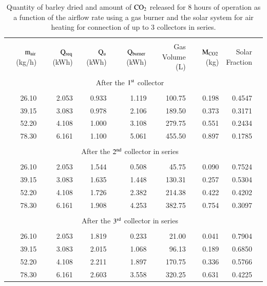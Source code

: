 \begin{table}[h]
	\caption{Quantity of barley dried and amount of $\rm{CO_2}$ released for 8 hours of operation as a function of the airflow rate using a gas burner and the solar system for air heating for connection of up to 3 collectors in series.}
	\centering
	
	\begin{tabular}{rrrrrrrr}
		\hline \\ [-10pt]
		 \makecell{$\rm{m_{air}}$ \\ (kg/h)} & \makecell{$\rm{Q_{req}}$ \\ (kWh)} & 	\makecell{$\rm{Q_{u}}$ \\ (kWh)} & 	\makecell{$\rm{Q_{burner}}$  \\ (kWh)} & \makecell{Gas Volume \\ (L)} & \makecell{$\rm{M_{CO2}}$  \\ (kg)} & \makecell{Solar \\ Fraction} \\
		\hline \\ [-10pt]
		\multicolumn{7}{c}{After the $\rm{1^{st}}$ collector} \\ \hline \\ [-10pt]
		26.10 & 2.053 & 0.933 & 1.119 & 100.75 & 0.198 & 0.4547 \\ [2pt]
		39.15 & 3.083 & 0.978 & 2.106 & 189.50 & 0.373 & 0.3171 \\ [2pt]
		52.20 & 4.108 & 1.000 & 3.108 & 279.75 & 0.551 & 0.2434 \\ [2pt]
		78.30 & 6.161 & 1.100 & 5.061 & 455.50 & 0.897 & 0.1785 \\
		\hline \\ [-10pt]
		\multicolumn{7}{c}{After the $\rm{2^{nd}}$ collector in series} \\ \hline \\ [-10pt]
		26.10 & 2.053 & 1.544 & 0.508 & 45.75 & 0.090 & 0.7524 \\ [2pt]
		39.15 & 3.083 & 1.635 & 1.448 & 130.31 & 0.257 & 0.5304 \\ [2pt]
		52.20 & 4.108 & 1.726 & 2.382 & 214.38 & 0.422 & 0.4202 \\ [2pt]
		78.30 & 6.161 & 1.908 & 4.253 & 382.75 & 0.754 & 0.3097 \\ 
		\hline \\ [-10pt]
		\multicolumn{7}{c}{After the $\rm{3^{rd}}$ collector in series} \\ \hline \\ [-10pt]
		26.10 & 2.053 & 1.819 & 0.233 & 21.00 & 0.041 & 0.7904 \\ [2pt]
		39.15 & 3.083 & 2.015 & 1.068 & 96.13 & 0.189 & 0.6850 \\ [2pt]
		52.20 & 4.108 & 2.211 & 1.897 & 170.75 & 0.336 & 0.5766 \\ [2pt]
		78.30 & 6.161 & 2.603 & 3.558 & 320.25 & 0.631 & 0.4225 \\
		\hline
	\end{tabular}
	
	\label{gas-solar}
\end{table}

